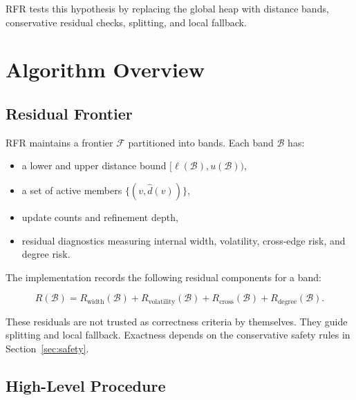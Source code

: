 \documentclass[11pt]{article}
\newcommand{\RFR}{\textsc{RFR}}
\newcommand{\frontier}{\mathcal{F}}
\newcommand{\band}{\mathcal{B}}
\begin{document}
\RFR{} tests this hypothesis by replacing the global heap with distance bands, conservative residual checks, splitting, and local fallback.

\section{Algorithm Overview}
\label{sec:algorithm}

\subsection{Residual Frontier}

\RFR{} maintains a frontier $\frontier$ partitioned into bands. Each band $\band$ has:

\begin{itemize}
  \item a lower and upper distance bound $[\ell(\band), u(\band))$,
  \item a set of active members $\{(v, \hat d(v))\}$,
  \item update counts and refinement depth,
  \item residual diagnostics measuring internal width, volatility, cross-edge risk, and degree risk.
\end{itemize}

The implementation records the following residual components for a band:

\[
  R(\band)=R_{\text{width}}(\band)+R_{\text{volatility}}(\band)+R_{\text{cross}}(\band)+R_{\text{degree}}(\band).
\]

These residuals are not trusted as correctness criteria by themselves. They guide splitting and local fallback. Exactness depends on the conservative safety rules in Section~\ref{sec:safety}.

\subsection{High-Level Procedure}
\end{document}
